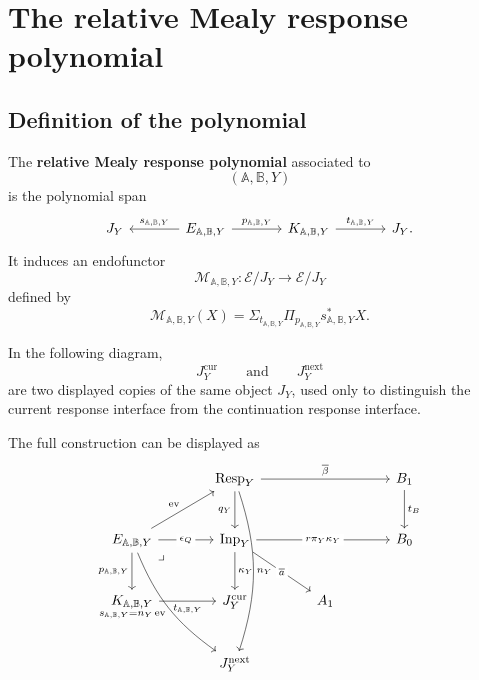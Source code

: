 \section{The relative Mealy response polynomial}
\label{sec:poly-relative-response-polynomial}

\subsection{Definition of the polynomial}
\label{subsec:poly-relative-response-polynomial-definition}

\begin{definition}
\label{def:poly-relative-mealy-response-polynomial}
The \textbf{relative Mealy response polynomial} associated to
\[
(\mathbb A,\mathbb B,Y)
\]
is the polynomial span
\[
\begin{tikzcd}[column sep=large]
J_Y
&
E_{\mathbb A,\mathbb B,Y}
  \arrow[l,"s_{\mathbb A,\mathbb B,Y}"']
  \arrow[r,"p_{\mathbb A,\mathbb B,Y}"]
&
K_{\mathbb A,\mathbb B,Y}
  \arrow[r,"t_{\mathbb A,\mathbb B,Y}"]
&
J_Y.
\end{tikzcd}
\]
It induces an endofunctor
\[
\mathcal M_{\mathbb A,\mathbb B,Y}:
\mathcal E/J_Y\to\mathcal E/J_Y
\]
defined by
\[
\mathcal M_{\mathbb A,\mathbb B,Y}(X)
=
\Sigma_{t_{\mathbb A,\mathbb B,Y}}
\Pi_{p_{\mathbb A,\mathbb B,Y}}
s_{\mathbb A,\mathbb B,Y}^{\ast}X.
\]
\end{definition}

In the following diagram,
\[
J_Y^{\mathrm{cur}}
\qquad\text{and}\qquad
J_Y^{\mathrm{next}}
\]
are two displayed copies of the same object \(J_Y\), used only to distinguish
the current response interface from the continuation response interface.

The full construction can be displayed as
\[
\begin{tikzcd}[column sep=large,row sep=large]
&
\mathrm{Resp}_Y
  \arrow[rr,"\overline\beta"]
  \arrow[d,"q_Y"']
  \arrow[ddd,bend left=18,"n_Y"]
&&
B_1
  \arrow[d,"t_B"]
\\
E_{\mathbb A,\mathbb B,Y}
  \arrow[ur,"\operatorname{ev}"]
  \arrow[r,"\epsilon_Q" description]
  \arrow[d,"p_{\mathbb A,\mathbb B,Y}"']
  \arrow[ddr,bend right=16,"s_{\mathbb A,\mathbb B,Y}=n_Y\operatorname{ev}"']
  \arrow[dr,phantom,very near start,"\lrcorner"]
&
\mathrm{Inp}_Y
  \arrow[rr,"r\pi_Y\kappa_Y" description]
  \arrow[d,"\kappa_Y"]
  \arrow[dr,"\overline a" description]
&&
B_0
\\
K_{\mathbb A,\mathbb B,Y}
  \arrow[r,"t_{\mathbb A,\mathbb B,Y}"']
&
J_Y^{\mathrm{cur}}
&
A_1
&
\\
&
J_Y^{\mathrm{next}}
&
&
\end{tikzcd}
\]

